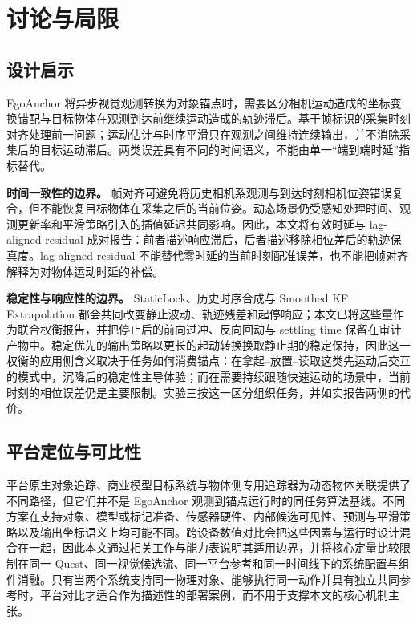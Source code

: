 \documentclass[review]{vgtc}
\begin{document}
\section{讨论与局限}\label{sec:discussion}


\subsection{设计启示}


EgoAnchor 将异步视觉观测转换为对象锚点时，需要区分相机运动造成的坐标变换错配与目标物体在观测到达前继续运动造成的轨迹滞后。基于帧标识的采集时刻对齐处理前一问题；运动估计与时序平滑只在观测之间维持连续输出，并不消除采集后的目标运动滞后。两类误差具有不同的时间语义，不能由单一“端到端时延”指标替代。

\textbf{时间一致性的边界。} 帧对齐可避免将历史相机系观测与到达时刻相机位姿错误复合，但不能恢复目标物体在采集之后的当前位姿。动态场景仍受感知处理时间、观测更新率和平滑策略引入的插值延迟共同影响。因此，本文将有效时延与 lag-aligned residual 成对报告：前者描述响应滞后，后者描述移除相位差后的轨迹保真度。lag-aligned residual 不能替代零时延的当前时刻配准误差，也不能把帧对齐解释为对物体运动时延的补偿。

\textbf{稳定性与响应性的边界。} StaticLock、历史时序合成与 Smoothed KF Extrapolation 都会共同改变静止波动、轨迹残差和起停响应；本文已将这些量作为联合权衡报告，并把停止后的前向过冲、反向回动与 settling time 保留在审计产物中。稳定优先的输出策略以更长的起动转换换取静止期的稳定保持，因此这一权衡的应用侧含义取决于任务如何消费锚点：在拿起--放置--读取这类先运动后交互的模式中，沉降后的稳定性主导体验；而在需要持续跟随快速运动的场景中，当前时刻的相位误差仍是主要限制。实验三按这一区分组织任务，并如实报告两侧的代价。

\subsection{平台定位与可比性}

平台原生对象追踪、商业模型目标系统与物体侧专用追踪器为动态物体关联提供了不同路径，但它们并不是 EgoAnchor 观测到锚点运行时的同任务算法基线。不同方案在支持对象、模型或标记准备、传感器硬件、内部候选可见性、预测与平滑策略以及输出坐标语义上均可能不同。跨设备数值对比会把这些因素与运行时设计混合在一起，因此本文通过相关工作与能力表说明其适用边界，并将核心定量比较限制在同一 Quest、同一视觉候选流、同一平台参考和同一时间线下的系统配置与组件消融。只有当两个系统支持同一物理对象、能够执行同一动作并具有独立共同参考时，平台对比才适合作为描述性的部署案例，而不用于支撑本文的核心机制主张。
\end{document}
